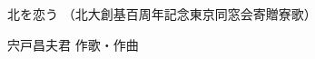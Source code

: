 \documentclass[10pt,b5j]{tarticle} %
\begin{document}
\begin{minipage}[c]{0.7\hsize} %
    \begin{center}
        {\LARGE
            北を恋う %
        }
        {\small 
            （北大創基百周年記念東京同窓会寄贈寮歌） %
        }
    \end{center}
\end{minipage}
\begin{minipage}[c]{0.3\hsize} %
    \begin{flushright} %
        宍戸昌夫君 作歌・作曲 %
    \end{flushright}
\end{minipage}
\end{document}
